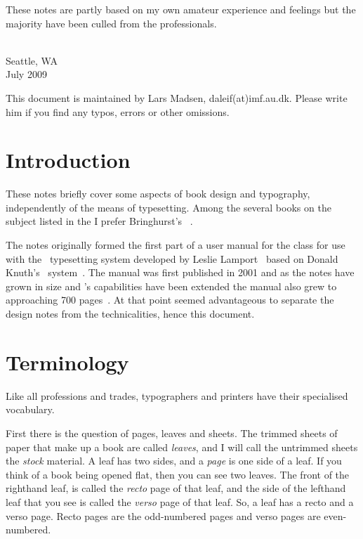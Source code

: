 \documentclass[10pt,letterpaper,extrafontsizes]{memoir}
\begin{document}
   These notes are partly based on my own amateur
experience and feelings but the majority have been culled from the
professionals.

{ \\ Seattle, WA \\ July 2009\par}


\vskip 3cm

\noindent
This document is maintained by Lars Madsen,
daleif(at)imf.au.dk. Please write him if you find any typos, errors or
other omissions.








\chapter{Introduction}

    These notes briefly cover some aspects of book design and typography, 
independently of the means of typesetting. Among
the several books on the subject listed in the \bibname{} I prefer
Bringhurst's ~\autocite{BRINGHURST99}.

    The notes originally formed the first part of a user manual for
the  class for 
use with the \ltx\ typesetting system developed by Leslie 
Lamport~\autocite{LAMPORT94} based 
on Donald Knuth's \tx\ system~\autocite{TEXBOOK}. 
The manual was first published in 2001
and as the notes have grown in size and 's capabilities 
have been extended the manual also grew to approaching 700 pages~\autocite{MEMMAN}. 
At that point seemed advantageous to separate the design notes from the 
technicalities, hence this document.




\chapter{Terminology}

    Like all professions and trades, typographers and printers have their
specialised vocabulary.

First there is the question of pages, leaves and sheets.  The trimmed
sheets of paper that make up a book are called
\emph{leaves}, and I will call the untrimmed sheets the
\emph{stock} material.  A leaf has two sides, and a
\emph{page} is one side of a leaf.  If you think of a book
being opened flat, then you can see two leaves. The front of the
righthand leaf, is called the \emph{recto} page of that
leaf, and the side of the lefthand leaf that you see is called the
\emph{verso} page of that leaf.  So, a leaf has a recto
and a verso page. Recto pages are the odd-numbered pages and verso
pages are even-numbered.
\end{document}
